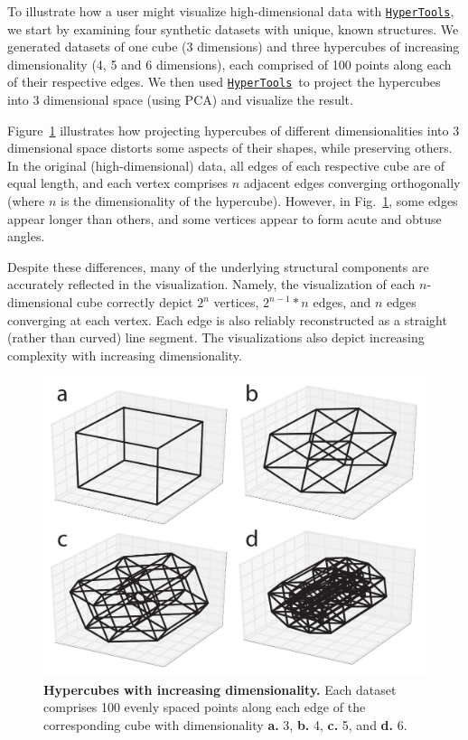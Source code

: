 \documentclass[12pt,letterpaper]{article}
\newcommand{\hypertools}{\href{https://github.com/ContextLab/hypertools}{\texttt{HyperTools}}}
\begin{document}
To illustrate how a user might visualize high-dimensional data with \hypertools, we start by examining four synthetic datasets with unique, known structures. We generated datasets of one cube (3 dimensions) and three hypercubes of increasing dimensionality (4, 5 and 6 dimensions), each comprised of 100 points along each of their respective edges.  We then used \hypertools~to project the hypercubes into 3 dimensional space (using PCA) and visualize the result. 

Figure~\ref{fig:hypercubes} illustrates how projecting hypercubes of different dimensionalities into 3 dimensional space distorts some aspects of their shapes, while preserving others. In the original (high-dimensional) data, all edges of each respective cube are of equal length, and each vertex comprises $n$ adjacent edges converging orthogonally (where $n$ is the dimensionality of the hypercube). However, in Fig.~\ref{fig:hypercubes}, some edges appear longer than others, and some vertices appear to form acute and obtuse angles.

Despite these differences, many of the underlying structural components are accurately reflected in the visualization. Namely, the visualization of each $n$-dimensional cube correctly depict $2^n$ vertices, $2^{n-1}*n$ edges, and $n$ edges converging at each vertex. Each edge is also reliably reconstructed as a straight (rather than curved) line segment.  The visualizations also depict increasing complexity with increasing dimensionality.

\begin{figure}[tbp]
\centering
\includegraphics[width=.75\textwidth]{hypercubes}
\caption{\textbf{Hypercubes with increasing dimensionality.} Each dataset comprises 100 evenly spaced points along each edge of the corresponding cube with dimensionality \textbf{a.} 3, \textbf{b.} 4, \textbf{c.} 5, and \textbf{d.} 6.}
\label{fig:hypercubes}
\end{figure}
\end{document}

